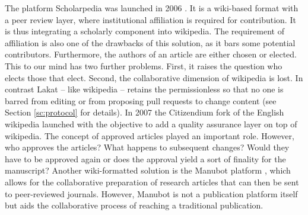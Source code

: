 The platform Scholarpedia was launched in 2006 \cite{izhikevich_scholarpedia}. It is a wiki-based format with a peer review layer, where institutional affiliation is required for contribution. It is thus integrating a scholarly component into wikipedia. The requirement of affiliation is also one of the drawbacks of this solution, as it bars some potential contributors. Furthermore, the authors of an article are either chosen or elected. This to our mind has two further problems. First, it raises the question who elects those that elect. Second, the collaborative dimension of wikipedia is lost. In contrast Lakat -- like wikipedia -- retains the permissionless so that no one is barred from editing or from proposing pull requests to change content (see Section \ref{sc:protocol} for details). In 2007 the Citizendium fork of the English wikipedia launched \cite{sanger_citizendium} with the objective to add a quality assurance layer on top of wikipedia. The concept of approved articles played an important role. However, who approves the articles? What happens to subsequent changes? Would they have to be approved again or does the approval yield a sort of finality for the manuscript?
Another wiki-formatted solution is the Manubot platform \cite{himmelstein2019open}, which allows for the collaborative preparation of research articles that can then be sent to peer-reviewed journals. However, Manubot is not a publication platform itself but aids the collaborative process of reaching a traditional publication. 

